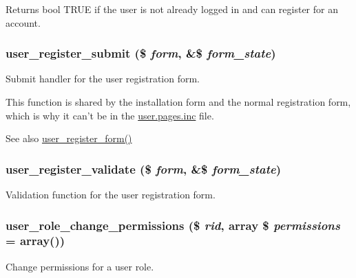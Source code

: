 \begin{DoxyReturn}{Returns}
bool TRUE if the user is not already logged in and can register for an account. 
\end{DoxyReturn}
\hypertarget{user_8module_ad104f5427b9f52630164ef58808ad037}{
\subsubsection[{user\_\-register\_\-submit}]{\setlength{\rightskip}{0pt plus 5cm}user\_\-register\_\-submit (\$ {\em form}, \/  \&\$ {\em form\_\-state})}}
\label{user_8module_ad104f5427b9f52630164ef58808ad037}
Submit handler for the user registration form.

This function is shared by the installation form and the normal registration form, which is why it can't be in the \hyperlink{user_8pages_8inc}{user.pages.inc} file.

\begin{DoxySeeAlso}{See also}
\hyperlink{group__forms_ga6dc04f116a25059727b3cf9e15205be8}{user\_\-register\_\-form()} 
\end{DoxySeeAlso}
\hypertarget{user_8module_a68ab440bc157b212a53dbe9a42a18107}{
\subsubsection[{user\_\-register\_\-validate}]{\setlength{\rightskip}{0pt plus 5cm}user\_\-register\_\-validate (\$ {\em form}, \/  \&\$ {\em form\_\-state})}}
\label{user_8module_a68ab440bc157b212a53dbe9a42a18107}
Validation function for the user registration form. \hypertarget{user_8module_a99fd9206a99c083a3f7ee09ba0c4a9ea}{
\subsubsection[{user\_\-role\_\-change\_\-permissions}]{\setlength{\rightskip}{0pt plus 5cm}user\_\-role\_\-change\_\-permissions (\$ {\em rid}, \/  array \$ {\em permissions} = {\ttfamily array()})}}
\label{user_8module_a99fd9206a99c083a3f7ee09ba0c4a9ea}
Change permissions for a user role.

